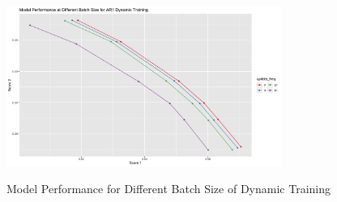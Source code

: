 \documentclass{article}
\begin{document}
\begin{figure}
    \caption{Model Performance for Different Batch Size of Dynamic Training}
    \centering
    \includegraphics[width = 0.8\textwidth]{images/ModelPerformanceatDifferentBatchSizeforAR1DynamicTraining.png}
    \label{fig:fig1.5.2}
\end{figure}
\end{document}
